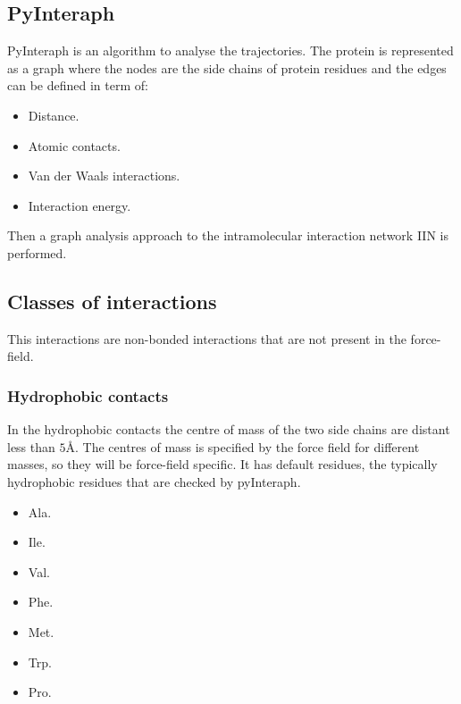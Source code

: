 	\subsection{PyInteraph}
	PyInteraph is an algorithm to analyse the trajectories.
	The protein is represented as a graph where the nodes are the side chains of protein residues and the edges can be defined in term of:

	\begin{multicols}{2}
		\begin{itemize}
			\item Distance.
			\item Atomic contacts.
			\item Van der Waals interactions.
			\item Interaction energy.
		\end{itemize}
	\end{multicols}

	Then a graph analysis approach to the intramolecular interaction network IIN is performed.

	\subsection{Classes of interactions}
	This interactions are non-bonded interactions that are not present in the force-field.

		\subsubsection{Hydrophobic contacts}
		In the hydrophobic contacts the centre of mass of the two side chains are distant less than $5\si{\angstrom}$.
		The centres of mass is specified by the force field for different masses, so they will be force-field specific.
		It has default residues, the typically hydrophobic residues that are checked by pyInteraph.

		\begin{multicols}{4}
			\begin{itemize}
				\item Ala.
				\item Ile.
				\item Val.
				\item Phe.
				\item Met.
				\item Trp.
				\item Pro.
			\end{itemize}
		\end{multicols}


